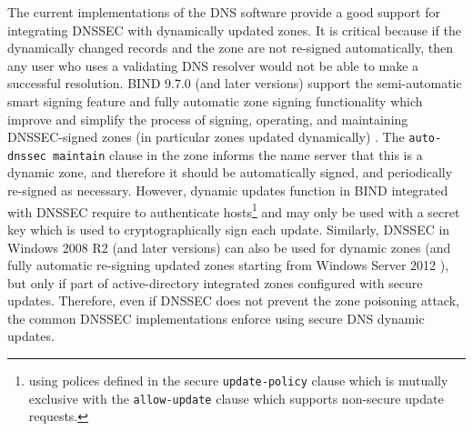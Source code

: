 The current implementations of the DNS software provide a good support for integrating DNSSEC with dynamically updated zones.
It is critical because if the dynamically changed records and the zone are not re-signed automatically, then any user who uses a validating DNS resolver would not be able to make a successful resolution.
BIND 9.7.0 (and later versions) support the semi-automatic smart signing feature and fully automatic zone signing functionality which improve and simplify the process of signing, operating, and maintaining DNSSEC-signed zones (in particular zones updated dynamically) \cite{bindman}.
The \texttt{auto-dnssec maintain} clause in the zone informs the name server that this is a dynamic zone, and therefore it should be automatically signed, and periodically re-signed as necessary.
However, dynamic updates function in BIND integrated with DNSSEC require to authenticate hosts\footnote{using polices defined in the secure \texttt{update-policy} clause which is mutually exclusive with the \texttt{allow-update} clause which supports non-secure update requests.} and may only be used with a secret key %
which is used to cryptographically sign each update.
Similarly, DNSSEC in %
Windows 2008 R2 \cite{micro} (and later versions) can also be used for dynamic zones (and fully automatic re-signing updated zones starting from Windows Server 2012 \cite{micro2}), but only if part of active-directory integrated zones configured with secure updates.
Therefore, even if DNSSEC does not prevent the zone poisoning attack, the common DNSSEC implementations enforce using secure DNS dynamic updates.